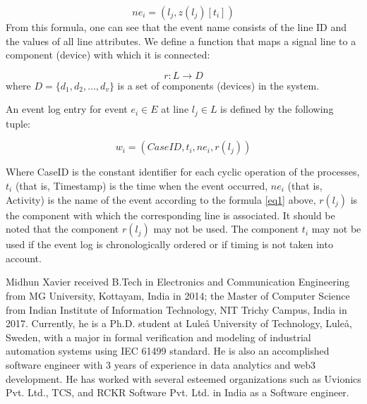 \documentclass{ieeeojies}
\begin{document}
\begin{equation} \label{eq1}
   ne_i = (l_j,z(l_j)[t_i]) 
\end{equation}   
From this formula, one can see that the event name consists of the line ID and the values of all line attributes. We define a function that maps a signal line to a component (device) with which it is connected: 

\[ r : L \rightarrow D \] 
where $ D=\{d_1,d_2,\dots, d_v\} $ is a set of components (devices) in the system. 

An event log entry for event $ e_i \in E $ at line  $ l_j \in L$ is defined by the following tuple: 

\[  w_i= (CaseID, t_i, ne_i, r(l_j)) \]

Where CaseID is the constant identifier for each cyclic operation of the processes, $t_i$ (that is, Timestamp) is the time when the event occurred, $ne_i$ (that is, Activity) is the name of the event according to the formula \ref{eq1} above, $r(l_j)$ is the component with which the corresponding line is associated.  It should be noted that the component $r(l_j)$ may not be used. The component $t_i$ may not be used if the event log is chronologically ordered or if timing is not taken into account.

\nolinenumbers





\begin{IEEEbiography}{Midhun Xavier} received B.Tech in Electronics and Communication Engineering from MG University, Kottayam, India in 2014; the Master of Computer Science from Indian Institute of Information Technology, NIT Trichy Campus, India in 2017. Currently, he is a Ph.D. student at Luleå University of Technology, Luleå, Sweden, with a major in formal verification and modeling of industrial automation systems using IEC 61499 standard. He is also an accomplished software engineer with 3 years of experience in data analytics and web3 development. He has worked with several esteemed organizations such as Uvionics Pvt. Ltd., TCS, and RCKR Software Pvt. Ltd. in India as a Software engineer. 
\end{IEEEbiography}
\end{document}
